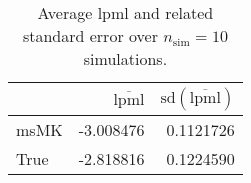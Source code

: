 \begin{table}[H]

\caption{Average lpml and related standard error over $n_{\text{sim}} = 10$ simulations.}
\centering
\begin{tabular}[t]{lrr}
\toprule
  & $\overbar{\text{lpml}}$ & $\text{sd}(\overbar{\text{lpml}})$\\
\midrule
msMK & -3.008476 & 0.1121726\\
True & -2.818816 & 0.1224590\\
\bottomrule
\end{tabular}
\end{table}